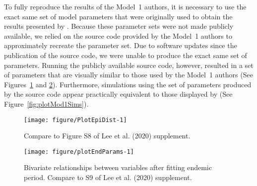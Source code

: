 To fully reproduce the results of the Model~1 authors, it is necessary to use the exact same set of model parameters that were originally used to obtain the results presented by \cite{lee20}.
Because these parameter sets were not made publicly available, we relied on the source code provided by the Model~1 authors to approximately recreate the parameter set.
Due to software updates since the publication of the source code, we were unable to produce the exact same set of parameters.
Running the publicly available source code, however, resulted in a set of parameters that are visually similar to those used by the Model~1 authors (See Figures~\ref{fig:PlotEpiDist} and \ref{fig:plotEndParams}).
Furthermore, simulations using the set of parameters produced by the source code appear practically equivalent to those displayed by \cite{lee20} (See Figure~\ref{fig:plotMod1Sims}).



\begin{knitrout}
\color{fgcolor}\begin{figure}

{\centering \texttt{[image: figure/PlotEpiDist-1]} 

}

\caption[Compare to Figure S8 of Lee et al]{Compare to Figure S8 of Lee et al. (2020) supplement.}\label{fig:PlotEpiDist}
\end{figure}

\end{knitrout}





\begin{knitrout}
\color{fgcolor}\begin{figure}

{\centering \texttt{[image: figure/plotEndParams-1]} 

}

\caption[Bivariate relationships between variables after fitting endemic period]{Bivariate relationships between variables after fitting endemic period. Compare to S9 of Lee et al. (2020) supplement.}\label{fig:plotEndParams}
\end{figure}

\end{knitrout}





